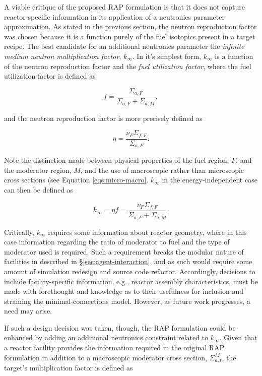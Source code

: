 A viable critique of the proposed RAP formulation is that it does not capture
reactor-specific information in its application of a neutronics parameter
approximation. As stated in the previous section, the neutron reproduction
factor was chosen because it is a function purely of the fuel isotopics present
in a target recipe. The best candidate for an additional neutronics parameter
the \textit{infinite medium neutron multiplication factor}, $k_\infty$. In it's
simplest form, $k_\infty$ is a function of the neutron reproduction factor and
the \textit{fuel utilization factor}, where the fuel utilization factor is
defined as

\begin{equation}
f = \frac{\Sigma_{a, F}}{\Sigma_{a, F} + \Sigma_{a, M}},
\end{equation}

and the neutron reproduction factor is more precisely defined as 

\begin{equation}
\eta = \frac{\nu_F \Sigma_{f, F}}{\Sigma_{a, F}}.
\end{equation}

Note the distinction made between physical properties of the fuel region, $F$,
and the moderator region, $M$, and the use of macroscopic rather than
microscopic cross sections (see Equation \ref{eqs:micro-macro}. $k_\infty$ in
the energy-independent case can then be defined as

\begin{equation}
k_\infty =  \eta f = \frac{\nu_F \Sigma_{f, F}}{\Sigma_{a, F} + \Sigma_{a, M}}.
\end{equation}

Critically, $k_\infty$ requires some information about reactor geometry, where
in this case information regarding the ratio of moderator to fuel and the type
of moderator used is required. Such a requirement breaks the modular nature of
facilities in \Cyclus described in \S \ref{sec:agent-interaction}, and as such
would require some amount of simulation redesign and source code refactor.
Accordingly, decisions to include facility-specific information, e.g., reactor
assembly characteristics, must be made with forethought and knowledge as to
their usefulness for inclusion and straining the minimal-connections
model. However, as future work progresses, a need may arise.

If such a design decision was taken, though, the RAP formulation could be
enhanced by adding an additional neutronics constraint related to
$k_\infty$. Given that a reactor facility provides the information required in
the original RAP formulation in addition to a macroscopic moderator cross
section, $\Sigma^M_{a,t}$, the target's multiplication factor is defined as

